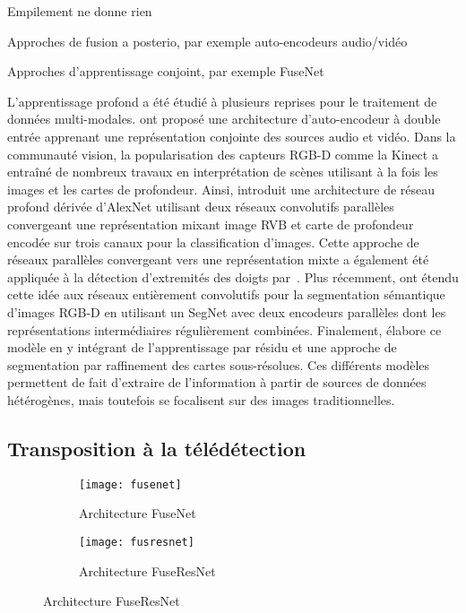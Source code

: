 Empilement ne donne rien

Approches de fusion a posterio, par exemple auto-encodeurs audio/vidéo

Approches d'apprentissage conjoint, par exemple FuseNet

L'apprentissage profond a été étudié à plusieurs reprises pour le traitement de données multi-modales. \citet{ngiam_multimodal_2011} ont proposé une architecture d'auto-encodeur à double entrée apprenant une représentation conjointe des sources audio et vidéo. Dans la communauté vision, la popularisation des capteurs \gls{RGB-D} comme la Kinect a entraîné de nombreux travaux en interprétation de scènes utilisant à la fois les images et les cartes de profondeur. Ainsi, \citet{eitel_multimodal_2015} introduit une architecture de réseau profond dérivée d'AlexNet utilisant deux réseaux convolutifs parallèles convergeant une représentation mixant image \gls{RVB} et carte de profondeur encodée sur trois canaux pour la classification d'images. Cette approche de réseaux parallèles convergeant vers une représentation mixte a également été appliquée à la détection d'extremités des doigts par~\citet{guo_two-stream_2016}.
Plus récemment, \citet{hazirbas_fusenet_2016} ont étendu cette idée aux réseaux entièrement convolutifs pour la segmentation sémantique d'images \gls{RGB-D} en utilisant un SegNet avec deux encodeurs parallèles dont les représentations intermédiaires régulièrement combinées. Finalement, \cite{lee_rdfnet_2017} élabore ce modèle en y intégrant de l'apprentissage par résidu et une approche de segmentation par raffinement des cartes sous-résolues. Ces différents modèles permettent de fait d'extraire de l'information à partir de sources de données hétérogènes, mais toutefois se focalisent sur des images traditionnelles.

\subsection{Transposition à la télédétection}


\begin{figure}
  \begin{subfigure}{0.5\textwidth}
    \texttt{[image: fusenet]}
    \caption{Architecture FuseNet~\cite{hazirbas_fusenet_2016}}
    \label{fig:fusenet}
  \end{subfigure}%
  \begin{subfigure}{0.5\textwidth}
    \texttt{[image: fusresnet]}
    \caption{Architecture FuseResNet}
    \label{fig:fusresnet}
  \end{subfigure}
\end{figure}

